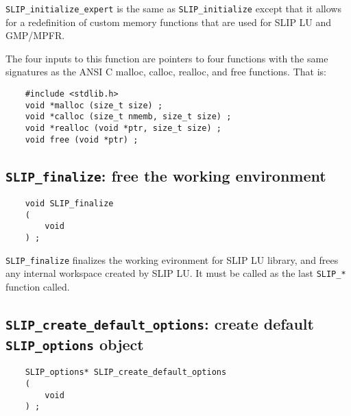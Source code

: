 \documentclass[12pt]{article}
\theoremstyle{definition}
\begin{document}
\verb|SLIP_initialize_expert| is the same as \verb|SLIP_initialize| except
that it allows for a redefinition of custom memory functions that are used for
SLIP LU and GMP/MPFR.

The four inputs to this function are pointers to four functions with the
same signatures as the ANSI C malloc, calloc, realloc, and free functions.
That is:

\begin{mdframed}[userdefinedwidth=6in]
{\footnotesize
\begin{verbatim}
    #include <stdlib.h>
    void *malloc (size_t size) ;
    void *calloc (size_t nmemb, size_t size) ;
    void *realloc (void *ptr, size_t size) ;
    void free (void *ptr) ;
\end{verbatim}
} \end{mdframed}

\cprotect\subsection{\verb|SLIP_finalize|: free the working environment}
\label{ss:SLIP_finalize}

\begin{mdframed}[userdefinedwidth=6in]
{\footnotesize
\begin{verbatim}
    void SLIP_finalize
    (
        void
    ) ;
\end{verbatim}
} \end{mdframed}

\verb|SLIP_finalize| finalizes the working evironment for SLIP LU
library, and frees any internal workspace created by SLIP LU.  It must be
called as the last \verb|SLIP_*| function called.

\cprotect\subsection{\verb|SLIP_create_default_options|: create default \verb|SLIP_options| object}
\label{ss:create_default_options}

\begin{mdframed}[userdefinedwidth=6in]
{\footnotesize
\begin{verbatim}
    SLIP_options* SLIP_create_default_options
    (
        void
    ) ;
\end{verbatim}
} \end{mdframed}
\end{document}
